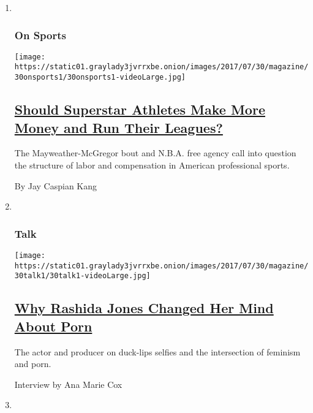 \begin{enumerate}
\def\labelenumi{\arabic{enumi}.}
\item ~
  \hypertarget{on-sports}{%
  \subsubsection{On Sports}\label{on-sports}}

  \texttt{[image: https://static01.graylady3jvrrxbe.onion/images/2017/07/30/magazine/30onsports1/30onsports1-videoLarge.jpg]}

  \hypertarget{should-superstar-athletes-make-more-money-and-run-their-leagues}{%
  \subsection{\texorpdfstring{\href{/2017/07/25/magazine/should-superstar-athletes-make-more-money-and-run-their-leagues.html}{Should
  Superstar Athletes Make More Money and Run Their
  Leagues?}}{Should Superstar Athletes Make More Money and Run Their Leagues?}}\label{should-superstar-athletes-make-more-money-and-run-their-leagues}}

  The Mayweather-McGregor bout and N.B.A. free agency call into question
  the structure of labor and compensation in American professional
  sports.

  By Jay Caspian Kang
\item ~
  \hypertarget{talk}{%
  \subsubsection{Talk}\label{talk}}

  \texttt{[image: https://static01.graylady3jvrrxbe.onion/images/2017/07/30/magazine/30talk1/30talk1-videoLarge.jpg]}

  \hypertarget{why-rashida-jones-changed-her-mind-about-porn}{%
  \subsection{\texorpdfstring{\href{/2017/07/26/magazine/why-rashida-jones-changed-her-mind-about-porn.html}{Why
  Rashida Jones Changed Her Mind About
  Porn}}{Why Rashida Jones Changed Her Mind About Porn}}\label{why-rashida-jones-changed-her-mind-about-porn}}

  The actor and producer on duck-lips selfies and the intersection of
  feminism and porn.

  Interview by Ana Marie Cox
\item ~
  \hypertarget{letter-of-recommendation}{%
}
\end{enumerate}
